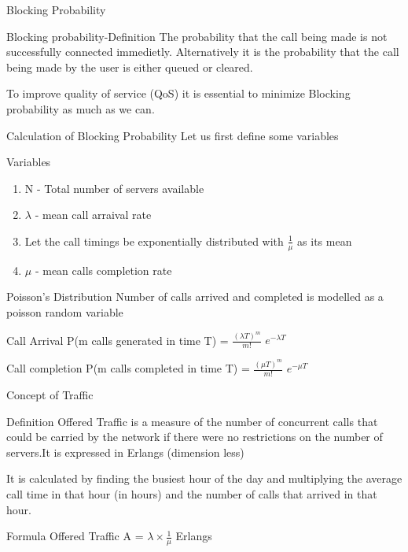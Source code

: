 \documentclass{beamer}
\begin{document}
\begin{frame}{Blocking Probability}
  \begin{block}{Blocking probability-Definition}
    The probability that the call being made is not successfully connected immedietly. Alternatively it is
    the probability that the call being made by the user is either queued or cleared.
  \end{block}
  To improve quality of service (QoS) it is essential to minimize Blocking probability as much as we can.
\end{frame}
\begin{frame}{Calculation of Blocking Probability}
  Let us first define some variables
  \begin{block}{Variables}
    \begin{enumerate}
      \item N - Total number of servers available
      \item $\lambda$ - mean call arraival rate
      \item Let the call timings be exponentially distributed with $\frac{1}{\mu}$ as its mean
      \item $\mu$ - mean calls completion rate
    \end{enumerate}
  \end{block}
\end{frame}
\begin{frame}{Poisson's Distribution}
  Number of calls arrived and completed is modelled as a poisson random variable
  \begin{block}{Call Arrival}
    P(m calls generated in time T) = $\frac{{(\lambda T)^m}}{m!}$ $e^{-\lambda T}$
  \end{block}
  \begin{block}{Call completion}
    P(m calls completed in time T) = $\frac{{(\mu T)^m}}{m!}$ $e^{-\mu T}$
  \end{block}
\end{frame}
\begin{frame}{Concept of Traffic}
  \begin{block}{Definition}
    Offered Traffic is a measure of the number of concurrent calls that could be carried by the network if
    there were no restrictions on the number of servers.It is expressed in Erlangs (dimension less)
  \end{block}
  It is calculated by finding the busiest hour of the day and multiplying the average call time in that hour (in hours)
  and the number of calls that arrived in that hour.
  \begin{block}{Formula}
    Offered Traffic A = $\lambda \times \frac{1}{\mu}$ Erlangs
  \end{block}
\end{frame}
\end{document}
